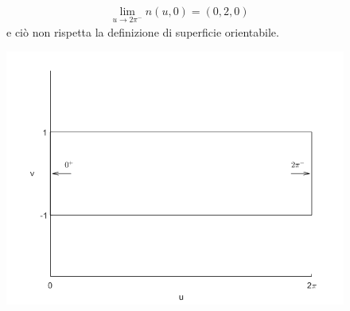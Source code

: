 \begin{example} 
\begin{figure}[H]
\begin{minipage}{0.5\textwidth}
\begin{align*}
     &\lim_{u \to 2\pi^-} n (u,0) = (0,2,0)
 \end{align*}
 e ciò non rispetta la definizione di superficie orientabile.
 \end{minipage}
 \begin{minipage}{0.3\textwidth}
     \includegraphics[width=\textwidth]{Capitoli/Capitolo6/Area per calcolo orientazione.png}
 \end{minipage}
 \end{figure}
 \end{example}
